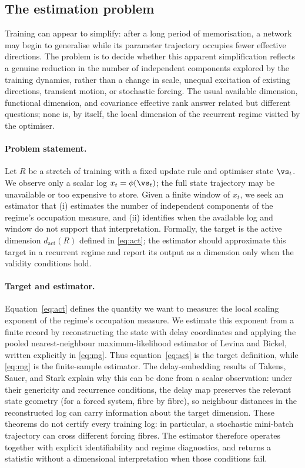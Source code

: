 \documentclass[twoside]{article}
\newenvironment{claude}{\color{claudecolor}}{}
\begin{document}
\begin{claude}
\subsection{The estimation problem}\label{sec:problem-formulation}

Training can appear to simplify: after a long period of memorisation, a network may begin to
generalise while its parameter trajectory occupies fewer effective directions. The problem is to
decide whether this apparent simplification reflects a genuine reduction in the number of
independent components explored by the training dynamics, rather than a change in scale, unequal
excitation of existing directions, transient motion, or stochastic forcing. The usual available
dimension, functional dimension, and covariance effective rank answer related but different
questions; none is, by itself, the local dimension of the recurrent regime visited by the optimiser.

\paragraph{Problem statement.} Let $R$ be a stretch of training with a fixed update rule and
optimiser state $\vs_t$. We observe only a scalar log $x_t = \phi(\vs_t)$; the full state trajectory
may be unavailable or too expensive to store. Given a finite window of $x_t$, we seek an estimator
that (i) estimates the number of independent components of the regime's occupation measure, and
(ii) identifies when the available log and window do not support that interpretation. Formally, the
target is the active dimension $d_{\mathrm{act}}(R)$ defined in \cref{eq:act}; the estimator should
approximate this target in a recurrent regime and report its output as a dimension only when the
validity conditions hold.

\paragraph{Target and estimator.} Equation~\cref{eq:act} defines the quantity we want to measure:
the local scaling exponent of the regime's occupation measure. We estimate this exponent from a
finite record by reconstructing the state with delay coordinates and applying the pooled
nearest-neighbour maximum-likelihood estimator of Levina and Bickel, written explicitly in
\cref{eq:mg}. Thus equation~\cref{eq:act} is the target definition, while \cref{eq:mg} is the
finite-sample estimator. The delay-embedding results of Takens, Sauer, and Stark explain why this
can be done from a scalar observation: under their genericity and recurrence conditions, the delay
map preserves the relevant state geometry (for a forced system, fibre by fibre), so neighbour
distances in the reconstructed log can carry information about the target dimension. These theorems
do not certify every training log: in particular, a stochastic mini-batch trajectory can cross
different forcing fibres. The estimator therefore operates together with explicit identifiability
and regime diagnostics, and returns a statistic without a dimensional interpretation when those
conditions fail.


\end{claude}
\end{document}
